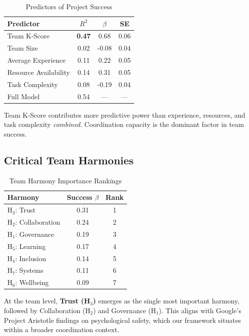 \documentclass[12pt,a4paper]{article}
\begin{document}
\begin{table}[H]
\centering
\caption{Predictors of Project Success}
\label{tab:team_predictors}
\begin{tabular}{lccc}
\toprule
\textbf{Predictor} & \textbf{$R^2$} & \textbf{$\beta$} & \textbf{SE} \\
\midrule
Team K-Score & \textbf{0.47} & 0.68 & 0.06 \\
Team Size & 0.02 & -0.08 & 0.04 \\
Average Experience & 0.11 & 0.22 & 0.05 \\
Resource Availability & 0.14 & 0.31 & 0.05 \\
Task Complexity & 0.08 & -0.19 & 0.04 \\
\midrule
Full Model & 0.54 & --- & --- \\
\bottomrule
\end{tabular}
\end{table}

Team K-Score contributes more predictive power than experience, resources, and task complexity \textit{combined}. Coordination capacity is the dominant factor in team success.

\subsection{Critical Team Harmonies}

\begin{table}[H]
\centering
\caption{Team Harmony Importance Rankings}
\label{tab:team_harmonies}
\begin{tabular}{lcc}
\toprule
\textbf{Harmony} & \textbf{Success $\beta$} & \textbf{Rank} \\
\midrule
H$_3$: Trust & 0.31 & 1 \\
H$_2$: Collaboration & 0.24 & 2 \\
H$_1$: Governance & 0.19 & 3 \\
H$_5$: Learning & 0.17 & 4 \\
H$_4$: Inclusion & 0.14 & 5 \\
H$_7$: Systems & 0.11 & 6 \\
H$_6$: Wellbeing & 0.09 & 7 \\
\bottomrule
\end{tabular}
\end{table}

At the team level, \textbf{Trust (H$_3$)} emerges as the single most important harmony, followed by Collaboration (H$_2$) and Governance (H$_1$). This aligns with Google's Project Aristotle findings on psychological safety, which our framework situates within a broader coordination context.
\end{document}

